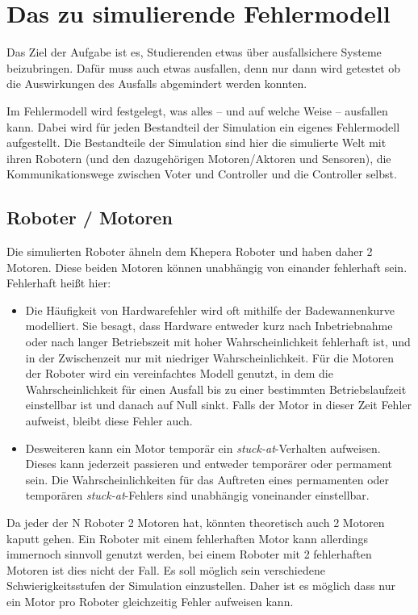 \clearpage
\section{Das zu simulierende Fehlermodell}\label{fm}
Das Ziel der Aufgabe ist es, Studierenden etwas {\"{u}}ber ausfallsichere Systeme beizubringen. Daf{\"{u}}r
muss auch etwas ausfallen, denn nur dann wird getestet ob die Auswirkungen des Ausfalls abgemindert werden 
konnten.

Im Fehlermodell wird festgelegt, was alles -- und auf welche Weise -- ausfallen kann. Dabei wird f{\"{u}}r jeden Bestandteil der Simulation ein eigenes Fehlermodell aufgestellt. Die Bestandteile
der Simulation sind hier die simulierte Welt mit ihren Robotern (und den dazugeh{\"{o}}rigen Motoren/Aktoren
und Sensoren), die Kommunikationswege zwischen Voter und Controller und die Controller selbst.

\subsection{Roboter / Motoren}
Die simulierten Roboter {\"{a}}hneln dem Khepera Roboter und haben daher 2 Motoren. Diese beiden Motoren k{\"{o}}nnen unabh{\"{a}}ngig von einander fehlerhaft sein. Fehlerhaft
hei{\ss}t hier:
\begin{itemize}
	\item Die H{\"{a}}ufigkeit von Hardwarefehler wird oft mithilfe der Badewannenkurve modelliert. Sie besagt,
		dass Hardware entweder kurz nach Inbetriebnahme oder nach langer Betriebszeit mit hoher
		Wahrscheinlichkeit fehlerhaft ist, und in der Zwischenzeit nur mit niedriger Wahrscheinlichkeit.
		F{\"{u}}r die Motoren der Roboter wird ein vereinfachtes Modell genutzt, in dem die Wahrscheinlichkeit 
		f{\"{u}}r einen Ausfall bis zu einer bestimmten Betriebslaufzeit einstellbar ist und danach auf
		Null sinkt. Falls der Motor in dieser Zeit Fehler aufweist, bleibt diese Fehler auch.
	\item Desweiteren kann ein Motor tempor{\"{a}}r ein \textit{stuck-at}-Verhalten aufweisen. Dieses
		kann jederzeit passieren und entweder tempor{\"{a}}rer oder permament sein.
		Die Wahrscheinlichkeiten f{\"{u}}r das Auftreten eines permamenten oder tempor{\"{a}}ren
		\textit{stuck-at}-Fehlers sind unabh{\"{a}}ngig voneinander einstellbar.
\end{itemize}

Da jeder der \gls{N} Roboter 2 Motoren hat, k{\"{o}}nnten theoretisch auch 2 Motoren kaputt gehen. Ein Roboter mit einem fehlerhaften Motor kann allerdings immernoch sinnvoll genutzt werden,
bei einem Roboter mit 2 fehlerhaften Motoren ist dies nicht der Fall. Es soll m{\"{o}}glich sein verschiedene 
Schwierigkeitsstufen der Simulation einzustellen. Daher ist es m{\"{o}}glich
dass nur ein Motor pro Roboter gleichzeitig Fehler aufweisen kann.

